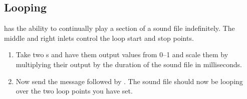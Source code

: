\subsection{Looping}

 has the ability to continually play a section of a sound file indefinitely.
The middle and right inlets control the loop start and stop points.  

\begin{enumerate}
\item Take two s and have them output values from 0--1 and scale them
by multiplying their output by the duration of the sound file in milliseconds.

\item Now send  the message  followed by .  The
sound file should now be looping over the two loop points you have set.  
\end{enumerate}


